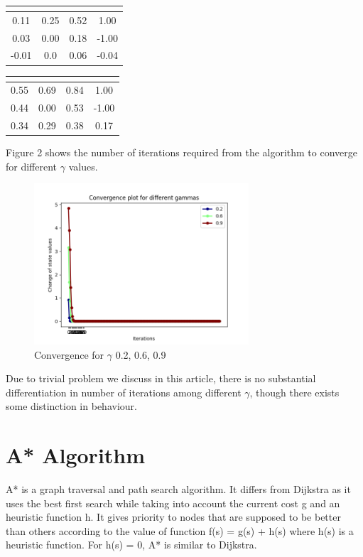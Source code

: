 \documentclass[10pt,a4paper,twocolumn]{article}
\begin{document}
		\begin{center}
		\begin{tabular}{ c c c c}
						 \hline
			\multicolumn{4}{|c|}{  \text{$\gamma = 0.6$} } \\
			\hline
			0.11 & 0.25 & 0.52 &1.00 \\ 
			0.03 & 0.00 & 0.18 & -1.00  \\  
			-0.01 &  0.0 & 0.06 & -0.04    
		\end{tabular}
	\end{center}

	\begin{center}
	\begin{tabular}{ c c c c}
		\hline
		\multicolumn{4}{|c|}{  \text{$\gamma = 0.9$} } \\
		\hline
		0.55  & 0.69  & 0.84 & 1.00 \\ 
		0.44  & 0.00  & 0.53  & -1.00 \\  
		0.34 &  0.29 & 0.38 & 0.17    
	\end{tabular}
\end{center}

Figure 2 shows the number of iterations required from the algorithm to converge for different $\gamma$ values. 

	\begin{figure}[ht!]
		\centering
		\includegraphics[width=80mm]{gammas}
		\caption{Convergence for $\gamma$ 0.2, 0.6, 0.9 }
	\end{figure}
	Due to trivial problem we discuss in this article, there is no substantial differentiation in number of iterations among different $\gamma$, though there exists some distinction in behaviour.

	\section{A* Algorithm}
	A* is a graph traversal and path search algorithm. It differs from Dijkstra as it uses the best first search while taking into account the current cost g and an heuristic function h. It gives priority to nodes that are supposed to be better than others according to the value of function f(s) = g(s) + h(s) where h(s) is a heuristic function. For h(s) = 0, A* is similar to Dijkstra.
	
\end{document}
